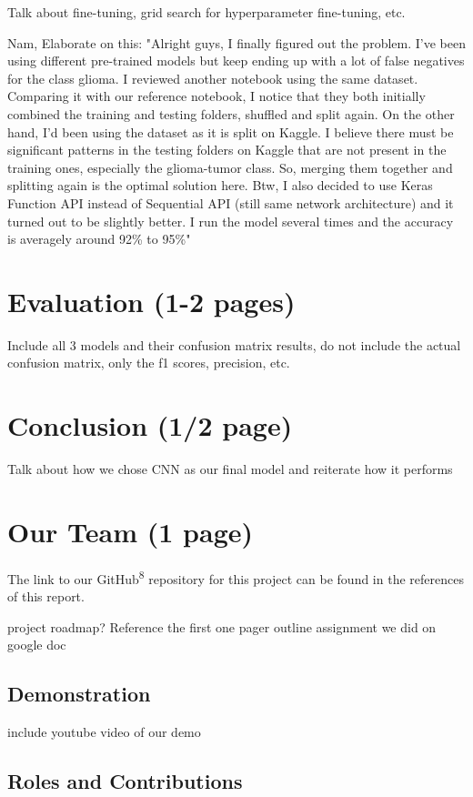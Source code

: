 \documentclass[conference]{IEEEtran}
\begin{document}
Talk about fine-tuning, grid search for hyperparameter fine-tuning, etc.

Nam, Elaborate on this: "Alright guys, I finally figured out the problem. I've been using different pre-trained models but keep ending up with a lot of false negatives for the class glioma. I reviewed another notebook using the same dataset. Comparing it with our reference notebook, I notice that they both initially combined the training and testing folders, shuffled and split again. On the other hand, I'd been using the dataset as it is split on Kaggle. I believe there must be significant patterns in the testing folders on Kaggle that are not present in the training ones, especially the glioma-tumor class. So, merging them together and splitting again is the optimal solution here. Btw, I also decided to use Keras Function API instead of Sequential API (still same network architecture) and it turned out to be slightly better. I run the model several times and the accuracy is averagely around 92\% to 95\%"

\section{\large Evaluation (1-2 pages)}
Include all 3 models and their confusion matrix results, do not include the actual confusion matrix, only the f1 scores, precision, etc. 

\section{\large Conclusion (1/2 page)}
Talk about how we chose CNN as our final model and reiterate how it performs

\section{\large Our Team (1 page)}
The link to our GitHub\textsuperscript{8} repository for this project can be found in the references of this report.

project roadmap? Reference the first one pager outline assignment we did on google doc
\subsection{\large Demonstration}
include youtube video of our demo

\subsection{\large Roles and Contributions}
\end{document}
